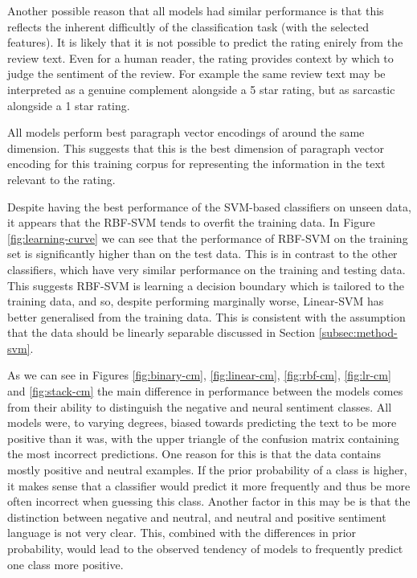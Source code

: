 \documentclass[11pt]{article}
\begin{document}
Another possible reason that all models had similar performance is that this reflects the inherent difficultly of the classification task (with the selected features). It is likely that it is not possible to predict the rating enirely from the review text. Even for a human reader, the rating provides context by which to judge the sentiment of the review. For example the same review text may be interpreted as a genuine complement alongside a 5 star rating, but as sarcastic alongside a 1 star rating.

All models perform best paragraph vector encodings of around the same dimension. This suggests that this is the best dimension of paragraph vector encoding for this training corpus for representing the information in the text relevant to the rating.

Despite having the best performance of the SVM-based classifiers on unseen data, it appears that the RBF-SVM tends to overfit the training data. In Figure \ref{fig:learning-curve} we can see that the performance of RBF-SVM on the training set is significantly higher than on the test data. This is in contrast to the other classifiers, which have very similar performance on the training and testing data. This suggests RBF-SVM is learning a decision boundary which is tailored to the training data, and so, despite performing marginally worse, Linear-SVM has better generalised from the training data. This is consistent with the assumption that the data should be linearly separable discussed in Section \ref{subsec:method-svm}.

As we can see in Figures \ref{fig:binary-cm}, \ref{fig:linear-cm}, \ref{fig:rbf-cm}, \ref{fig:lr-cm} and \ref{fig:stack-cm} the main difference in performance between the models comes from their ability to distinguish the negative and neural sentiment classes. All models were, to varying degrees, biased towards predicting the text to be more positive than it was, with the upper triangle of the confusion matrix containing the most incorrect predictions. One reason for this is that the data contains mostly positive and neutral examples. If the prior probability of a class is higher, it makes sense that a classifier would predict it more frequently and thus be more often incorrect when guessing this class. Another factor in this may be is that the distinction between negative and neutral, and neutral and positive sentiment language is not very clear. This, combined with the differences in prior probability, would lead to the observed tendency of models to frequently predict one class more positive.
\end{document}
